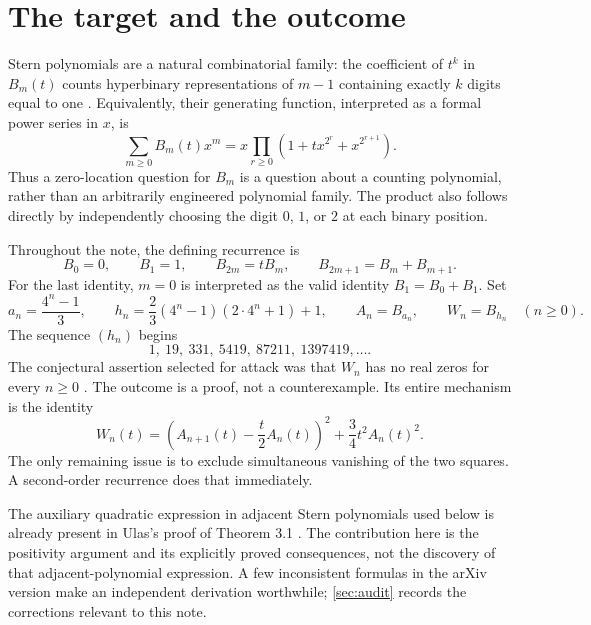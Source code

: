 \documentclass[11pt]{article}
\numberwithin{equation}{section}
\theoremstyle{definition}
\begin{document}
\section{The target and the outcome}\label{sec:target}

Stern polynomials are a natural combinatorial family: the coefficient of
$t^k$ in $B_m(t)$ counts hyperbinary representations of $m-1$ containing
exactly $k$ digits equal to one \cite{KMP}.  Equivalently, their generating
function, interpreted as a formal power series in $x$, is
\begin{equation}\label{eq:hyperbinary}
 \sum_{m\geq0}B_m(t)x^m
 =x\prod_{r\geq0}\left(1+t x^{2^r}+x^{2^{r+1}}\right).
\end{equation}
Thus a zero-location question for $B_m$ is a question about a counting
polynomial, rather than an arbitrarily engineered polynomial family.
The product also follows directly by independently choosing the digit
$0$, $1$, or $2$ at each binary position.

Throughout the note, the defining recurrence is
\begin{equation}\label{eq:stern}
 B_0=0,\qquad B_1=1,\qquad
 B_{2m}=tB_m,\qquad B_{2m+1}=B_m+B_{m+1}.
\end{equation}
For the last identity, $m=0$ is interpreted as the valid identity $B_1=B_0+B_1$.
Set
\begin{equation}\label{eq:indices}
 a_n=\frac{4^n-1}{3},\qquad
 h_n=\frac23(4^n-1)(2\cdot4^n+1)+1,\qquad
 A_n=B_{a_n},\qquad W_n=B_{h_n}\quad(n\geq0).
\end{equation}
The sequence $(h_n)$ begins
\[
 1,\ 19,\ 331,\ 5419,\ 87211,\ 1397419,\ldots.
\]
The conjectural assertion selected for attack was that $W_n$ has no real
zeros for every $n\geq0$ \cite[Conjecture 4.4]{Ulas}.  The outcome is a proof,
not a counterexample.  Its entire mechanism is the identity
\begin{equation}\label{eq:mainpreview}
 \boxed{\quad W_n(t)
  =\left(A_{n+1}(t)-\frac t2 A_n(t)\right)^2
     +\frac34 t^2 A_n(t)^2.\quad}
\end{equation}
The only remaining issue is to exclude simultaneous vanishing of the two
squares.  A second-order recurrence does that immediately.

The auxiliary quadratic expression in adjacent Stern polynomials used below
is already present in Ulas's proof of Theorem 3.1 \cite{Ulas}.  The contribution
here is the positivity argument and its explicitly proved consequences, not
the discovery of that adjacent-polynomial expression.  A few inconsistent
formulas in the arXiv version make an independent derivation worthwhile;
\cref{sec:audit} records the corrections relevant to this note.
\end{document}
